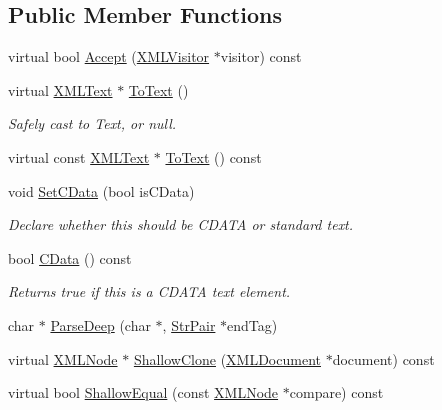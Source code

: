 \subsection*{Public Member Functions}
\begin{DoxyCompactItemize}
\item 
virtual bool \hyperlink{classtinyxml2_1_1_x_m_l_text_ae659d4fc7351a7df11c111cbe1ade46f}{Accept} (\hyperlink{classtinyxml2_1_1_x_m_l_visitor}{X\+M\+L\+Visitor} $\ast$visitor) const 
\item 
virtual \hyperlink{classtinyxml2_1_1_x_m_l_text}{X\+M\+L\+Text} $\ast$ \hyperlink{classtinyxml2_1_1_x_m_l_text_ab1213b4ddebe9b17ec7e7040e9f1caf7}{To\+Text} ()
\begin{DoxyCompactList}\small\item\em Safely cast to Text, or null. \end{DoxyCompactList}\item 
virtual const \hyperlink{classtinyxml2_1_1_x_m_l_text}{X\+M\+L\+Text} $\ast$ \hyperlink{classtinyxml2_1_1_x_m_l_text_a1e53cbc60968fe966790a65eaf87baaa}{To\+Text} () const 
\item 
void \hyperlink{classtinyxml2_1_1_x_m_l_text_ad080357d76ab7cc59d7651249949329d}{Set\+C\+Data} (bool is\+C\+Data)
\begin{DoxyCompactList}\small\item\em Declare whether this should be C\+D\+A\+T\+A or standard text. \end{DoxyCompactList}\item 
bool \hyperlink{classtinyxml2_1_1_x_m_l_text_a125574fe49da80efbae1349f20d02d41}{C\+Data} () const 
\begin{DoxyCompactList}\small\item\em Returns true if this is a C\+D\+A\+T\+A text element. \end{DoxyCompactList}\item 
char $\ast$ \hyperlink{classtinyxml2_1_1_x_m_l_text_ac18d9eec9f12b827b0d02b0847bf279e}{Parse\+Deep} (char $\ast$, \hyperlink{classtinyxml2_1_1_str_pair}{Str\+Pair} $\ast$end\+Tag)
\item 
virtual \hyperlink{classtinyxml2_1_1_x_m_l_node}{X\+M\+L\+Node} $\ast$ \hyperlink{classtinyxml2_1_1_x_m_l_text_af5115f8cc83de2947ed6a9d13e2f88c8}{Shallow\+Clone} (\hyperlink{classtinyxml2_1_1_x_m_l_document}{X\+M\+L\+Document} $\ast$document) const 
\item 
virtual bool \hyperlink{classtinyxml2_1_1_x_m_l_text_a1588aa5d23cb21eb31f36df0aaaa8d66}{Shallow\+Equal} (const \hyperlink{classtinyxml2_1_1_x_m_l_node}{X\+M\+L\+Node} $\ast$compare) const 
\end{DoxyCompactItemize}
